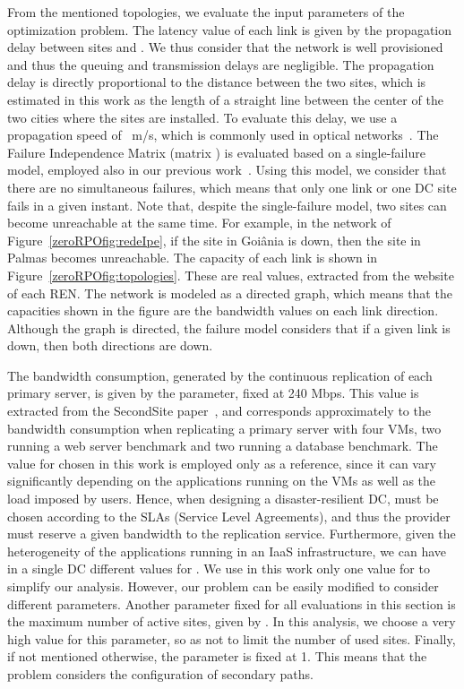 \documentclass[preprint]{elsarticle}
\begin{document}
From the mentioned topologies, we evaluate the input parameters of the optimization problem.
The latency value  of each link is given by the propagation delay between sites  and .
We thus consider that the network is well provisioned and thus the queuing and transmission delays are negligible.
The propagation delay is directly proportional to the distance between the two sites, which is estimated in this work as the length of a straight line between the center of the two cities where the sites are installed. To evaluate this delay, we use a propagation speed of ~m/s, which is commonly used in optical networks~\cite{couto2014Latency}. The Failure Independence Matrix (matrix ) is evaluated based on a single-failure model, employed also in our previous work~\cite{couto2014Latency}. Using this model, we consider that there are no simultaneous failures, which means that only one link or one DC site fails in a given instant. Note that, despite the single-failure model, two sites can become unreachable at the same time. For example, in the network of Figure~\ref{zeroRPOfig:redeIpe}, if the site in Goi\^ania is down, then the site in Palmas becomes unreachable. The capacity  of each link is shown in Figure~\ref{zeroRPOfig:topologies}. These are real values, extracted from the website of each REN. The network is modeled as a directed graph, which means that the capacities shown in the figure are the bandwidth values on each link direction. Although the graph is directed, the failure model considers that if a given link is down, then both directions are down.

The bandwidth consumption, generated by the continuous replication of each primary server, is given by the  parameter, fixed at 240 Mbps. 
This value is extracted from the SecondSite paper~\cite{rajagopalan2012secondsite}, and corresponds approximately to the bandwidth consumption when replicating a primary server with four VMs, two running a web server benchmark and two running a database benchmark. 
The value for  chosen in this work is employed only as a reference, since it can vary significantly depending on the applications running on the VMs as well as the load imposed by users. Hence, when designing a disaster-resilient DC,  must be chosen according to the SLAs (Service Level Agreements), and thus the provider must reserve a given bandwidth to the replication service. Furthermore, given the heterogeneity of the applications running in an IaaS infrastructure, we can have in a single DC different values for . We use in this work only one value for  to simplify our analysis. However, our problem can be easily modified to consider different  parameters. Another parameter fixed for all evaluations in this section is the maximum number of active sites, given by . In this analysis, we choose a very high value for this parameter, so as not to limit the number of used sites. Finally, if not mentioned otherwise, the  parameter is fixed at 1. This means that the problem considers the configuration of secondary paths.
\end{document}
